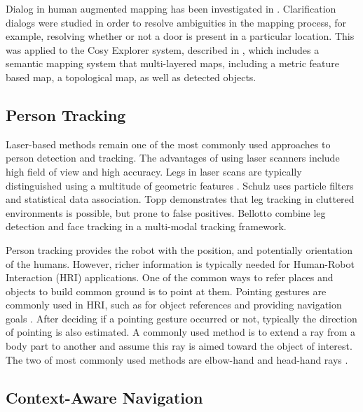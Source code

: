 \documentclass{tADR2e}
\begin{document}
Dialog in human augmented mapping has been investigated in \cite{kruijff2006clarification}. 
Clarification dialogs were studied in order to resolve ambiguities in the mapping process,
for example, resolving whether or not a door is present in a particular location. This was applied to the Cosy Explorer system, described in \cite{zender2007integrated}, 
which includes a semantic mapping system that multi-layered maps, including a metric feature based
map, a topological map, as well as detected objects.

\subsection{Person Tracking}
\label{sec:rel_person_tracking}

Laser-based methods remain one of the most commonly used approaches to person detection and tracking. 
The advantages of using laser scanners include high field of view and high accuracy. Legs in laser scans are typically distinguished using a multitude of geometric features \cite{arras2007using}. 
Schulz \cite{schulz2001tracking} uses particle filters and statistical data association.
Topp \cite{topp2005tracking} demonstrates that leg tracking in cluttered
environments is possible, but prone to false positives. Bellotto \cite{bellotto2009multisensor} combine leg detection 
and face tracking in a multi-modal tracking framework.

Person tracking provides the robot with the position, and potentially orientation of the humans.
However, richer information is typically needed for Human-Robot Interaction (HRI) applications. 
One of the common ways to refer places and objects to build common ground is to point at them. 
Pointing gestures are commonly used in HRI, such as for object references \cite{schmidt2008interacting} and providing navigation goals \cite{van2011real}. After deciding if a pointing gesture occurred or not, typically the direction of pointing
is also estimated. A commonly used method is to extend a ray from a body part to another and assume this ray is aimed toward the object of interest. The two of most commonly used methods are elbow-hand \cite{brooks2006working} and head-hand rays \cite{schmidt2008interacting}.

\subsection{Context-Aware Navigation}
\label{sec:rel_context_aware_navigation}
\end{document}
